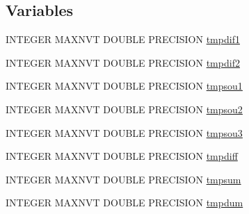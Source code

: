 \subsection*{Variables}
\begin{DoxyCompactItemize}
\item 
I\-N\-T\-E\-G\-E\-R M\-A\-X\-N\-V\-T D\-O\-U\-B\-L\-E P\-R\-E\-C\-I\-S\-I\-O\-N \hyperlink{msa20_2home_2abonfi_2_c_f_d__codes_2_eul_f_s_83_82_83_2include_2tdebug_8com_a7d0989f9a38016617ca1bc61561d66ff}{tmpdif1}
\item 
I\-N\-T\-E\-G\-E\-R M\-A\-X\-N\-V\-T D\-O\-U\-B\-L\-E P\-R\-E\-C\-I\-S\-I\-O\-N \hyperlink{msa20_2home_2abonfi_2_c_f_d__codes_2_eul_f_s_83_82_83_2include_2tdebug_8com_ab964a6f708f4f29204794080b9468323}{tmpdif2}
\item 
I\-N\-T\-E\-G\-E\-R M\-A\-X\-N\-V\-T D\-O\-U\-B\-L\-E P\-R\-E\-C\-I\-S\-I\-O\-N \hyperlink{msa20_2home_2abonfi_2_c_f_d__codes_2_eul_f_s_83_82_83_2include_2tdebug_8com_a023b3a6f5da0440dce335a556cb89fe6}{tmpsou1}
\item 
I\-N\-T\-E\-G\-E\-R M\-A\-X\-N\-V\-T D\-O\-U\-B\-L\-E P\-R\-E\-C\-I\-S\-I\-O\-N \hyperlink{msa20_2home_2abonfi_2_c_f_d__codes_2_eul_f_s_83_82_83_2include_2tdebug_8com_a7e31143aa010697a65a7ffe87ef242e7}{tmpsou2}
\item 
I\-N\-T\-E\-G\-E\-R M\-A\-X\-N\-V\-T D\-O\-U\-B\-L\-E P\-R\-E\-C\-I\-S\-I\-O\-N \hyperlink{msa20_2home_2abonfi_2_c_f_d__codes_2_eul_f_s_83_82_83_2include_2tdebug_8com_aa8356e45fafae8344ea4ae9ccfe00326}{tmpsou3}
\item 
I\-N\-T\-E\-G\-E\-R M\-A\-X\-N\-V\-T D\-O\-U\-B\-L\-E P\-R\-E\-C\-I\-S\-I\-O\-N \hyperlink{msa20_2home_2abonfi_2_c_f_d__codes_2_eul_f_s_83_82_83_2include_2tdebug_8com_a5fcc422c86549ee48051b12b4b0b9003}{tmpdiff}
\item 
I\-N\-T\-E\-G\-E\-R M\-A\-X\-N\-V\-T D\-O\-U\-B\-L\-E P\-R\-E\-C\-I\-S\-I\-O\-N \hyperlink{msa20_2home_2abonfi_2_c_f_d__codes_2_eul_f_s_83_82_83_2include_2tdebug_8com_af2cc9aa6a0cb8a889362cdb7fc0977ea}{tmpsum}
\item 
I\-N\-T\-E\-G\-E\-R M\-A\-X\-N\-V\-T D\-O\-U\-B\-L\-E P\-R\-E\-C\-I\-S\-I\-O\-N \hyperlink{msa20_2home_2abonfi_2_c_f_d__codes_2_eul_f_s_83_82_83_2include_2tdebug_8com_a85a53731c75ba4f8b2fb687cdcbe3f66}{tmpdum}
\end{DoxyCompactItemize}


